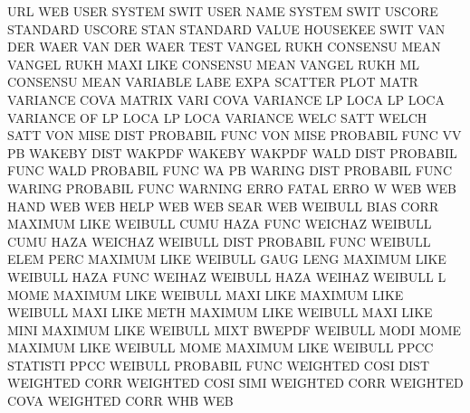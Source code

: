 URL                                     WEB
USER                                    SYSTEM   SWIT
USER     NAME                           SYSTEM   SWIT
USCORE                                  STANDARD
USCORE   STAN                           STANDARD
VALUE                                   HOUSEKEE SWIT
VAN      DER  WAER                      VAN      DER  WAER TEST
VANGEL   RUKH                           CONSENSU MEAN
VANGEL   RUKH MAXI LIKE                 CONSENSU MEAN
VANGEL   RUKH ML                        CONSENSU MEAN
VARIABLE LABE EXPA                      SCATTER  PLOT MATR
VARIANCE COVA                           MATRIX   VARI COVA
VARIANCE LP   LOCA                      LP       LOCA
VARIANCE OF   LP   LOCA                 LP       LOCA
VARIANCE WELC SATT                      WELCH    SATT
VON      MISE DIST                      PROBABIL FUNC
VON      MISE                           PROBABIL FUNC
VV                                      PB
WAKEBY   DIST                           WAKPDF
WAKEBY                                  WAKPDF
WALD     DIST                           PROBABIL FUNC
WALD                                    PROBABIL FUNC
WA                                      PB
WARING   DIST                           PROBABIL FUNC
WARING                                  PROBABIL FUNC
WARNING  ERRO                           FATAL    ERRO
W                                       WEB
WEB      HAND                           WEB
WEB      HELP                           WEB
WEB      SEAR                           WEB
WEIBULL  BIAS CORR                      MAXIMUM  LIKE
WEIBULL  CUMU HAZA FUNC                 WEICHAZ
WEIBULL  CUMU HAZA                      WEICHAZ
WEIBULL  DIST                           PROBABIL FUNC
WEIBULL  ELEM PERC                      MAXIMUM  LIKE
WEIBULL  GAUG LENG                      MAXIMUM  LIKE
WEIBULL  HAZA FUNC                      WEIHAZ
WEIBULL  HAZA                           WEIHAZ
WEIBULL  L    MOME                      MAXIMUM  LIKE
WEIBULL  MAXI LIKE                      MAXIMUM  LIKE
WEIBULL  MAXI LIKE METH                 MAXIMUM  LIKE
WEIBULL  MAXI LIKE MINI                 MAXIMUM  LIKE
WEIBULL  MIXT                           BWEPDF
WEIBULL  MODI MOME                      MAXIMUM  LIKE
WEIBULL  MOME                           MAXIMUM  LIKE
WEIBULL  PPCC                           STATISTI PPCC
WEIBULL                                 PROBABIL FUNC
WEIGHTED COSI DIST                      WEIGHTED CORR
WEIGHTED COSI SIMI                      WEIGHTED CORR
WEIGHTED COVA                           WEIGHTED CORR
WHB                                     WEB
